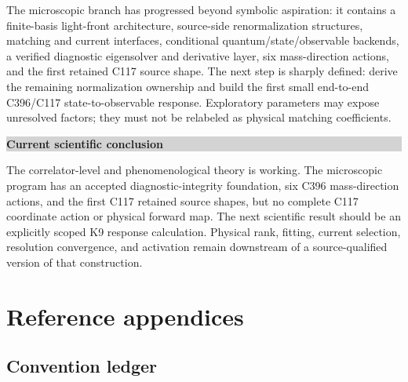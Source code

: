 \documentclass[11pt,oneside]{book}
\newenvironment{claimbox}[1]{%
  \begin{center}\begin{minipage}{0.94\textwidth}
  \colorbox{lightgray}{\parbox{0.96\textwidth}{\textbf{#1}}}\smallskip\par
}{%
  \end{minipage}\end{center}
}
\begin{document}
The microscopic branch has progressed beyond symbolic aspiration: it contains a finite-basis light-front architecture, source-side renormalization structures, matching and current interfaces, conditional quantum/state/observable backends, a verified diagnostic eigensolver and derivative layer, six mass-direction actions, and the first retained C117 source shape.  The next step is sharply defined: derive the remaining normalization ownership and build the first small end-to-end C396/C117 state-to-observable response.  Exploratory parameters may expose unresolved factors; they must not be relabeled as physical matching coefficients.

\begin{claimbox}{Current scientific conclusion}
The correlator-level and phenomenological theory is working.  The microscopic program has an accepted diagnostic-integrity foundation, six C396 mass-direction actions, and the first C117 retained source shapes, but no complete C117 coordinate action or physical forward map.  The next scientific result should be an explicitly scoped K9 response calculation.  Physical rank, fitting, current selection, resolution convergence, and activation remain downstream of a source-qualified version of that construction.
\end{claimbox}

\appendix
\part{Reference appendices}

\chapter{Convention ledger}
\label{app:conventions}
\end{document}

